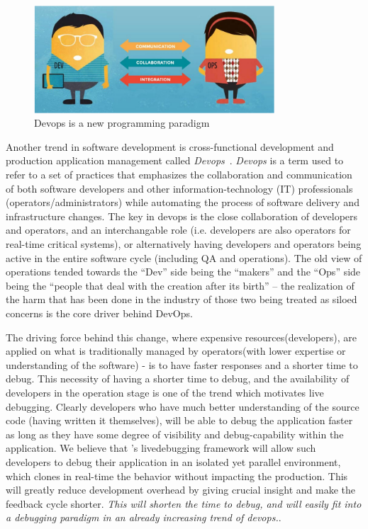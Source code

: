 \begin{figure}[h!]
	\begin{center}
		\includegraphics[width=0.8\textwidth]{guided/figs/devops.pdf}
		\caption{Devops is a new programming paradigm}
		\label{fig:devops}
	\end{center}
\end{figure}

Another trend in software development is cross-functional development and production application management called \emph{Devops}~\cite{10DevOps}.
\emph{Devops} is a term used to refer to a set of practices that emphasizes the collaboration and communication of both software developers and other information-technology (IT) professionals (operators/administrators) while automating the process of software delivery and infrastructure changes.
The key in devops is the close collaboration of developers and operators, and an interchangable role (i.e. developers are also operators for real-time critical systems), or alternatively having developers and operators being active in the entire software cycle (including QA and operations).
The old view of operations tended towards the “Dev” side being the “makers” and the “Ops” side being the “people that deal with the creation after its birth” – the realization of the harm that has been done in the industry of those two being treated as siloed concerns is the core driver behind DevOps.

The driving force behind this change, where expensive resources(developers), are applied on what is traditionally managed by operators(with lower expertise or understanding of the software) - is to have faster responses and a shorter time to debug.
This necessity of having a shorter time to debug, and the availability of developers in the operation stage is one of the trend which motivates live debugging. 
Clearly developers who have much better understanding of the source code (having written it themselves), will be able to debug the application faster as long as they have some degree of visibility and debug-capability within the application.
We believe that \parikshan's livedebugging framework will allow such developers to debug their application in an isolated yet parallel environment, which clones in real-time the behavior without impacting the production.
This will greatly reduce development overhead by giving crucial insight and make the feedback cycle shorter.
\emph{This will shorten the time to debug, and will easily fit into a debugging paradigm in an already increasing trend of devops.}.


